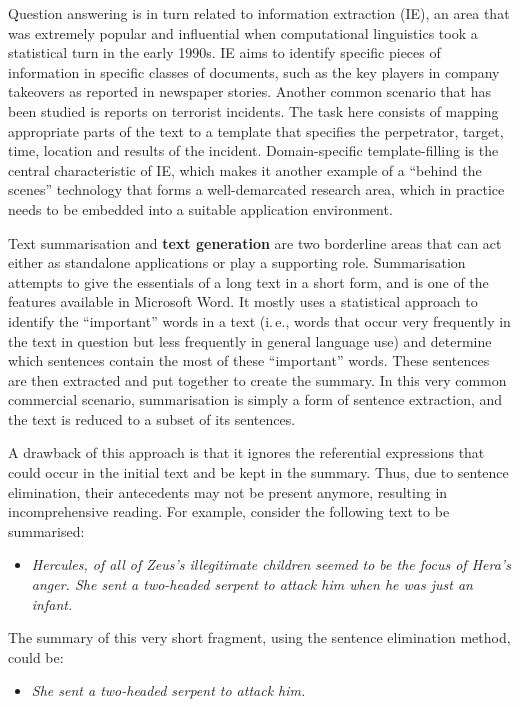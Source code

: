 \begin{multicols}{2}
Question answering is in turn related to information extraction (IE), an area that was extremely popular and influential when computational linguistics took a statistical turn in the early 1990s. IE aims to identify specific pieces of information in specific classes of documents, such as the key players in company takeovers as reported in newspaper stories. Another common scenario that has been studied is reports on terrorist incidents. The task here consists of mapping appropriate parts of the text to a template that specifies the perpetrator, target, time, location and results of the incident. Domain-specific template-filling is the central characteristic of IE, which makes it another example of a “behind the scenes” technology that forms a well-demarcated research area, which in practice needs to be embedded into a suitable application environment. 

Text summarisation and \textbf{text generation} are two borderline areas that can act either as standalone applications or play a supporting role. Summarisation attempts to give the essentials of a long text in a short form, and is one of the features available in Microsoft Word. It mostly uses a statistical approach to identify the “important” words in a text (i.\,e., words that occur very frequently in the text in question but less frequently in general language use) and determine which sentences contain the most of these “important” words. These sentences are then extracted and put together to create the summary. In this very common commercial scenario, summarisation is simply a form of sentence extraction, and the text is reduced to a subset of its sentences. 

A drawback of this approach is that it ignores the referential expressions that could occur in the initial text and be kept in the summary. Thus, due to sentence elimination, their antecedents may not be present anymore, resulting in incomprehensive reading. For example, consider the following text to be summarised:

\begin{itemize}
\item\textit{Hercules, of all of Zeus’s illegitimate children seemed to be the focus of Hera’s anger. She sent a two-headed serpent to attack him when he was just an infant.}
\end{itemize}

The summary of this very short fragment, using the sentence elimination method, could be:

\begin{itemize}
\item \textit{She sent a two-headed serpent to attack him.}
\end{itemize}


\end{multicols}
